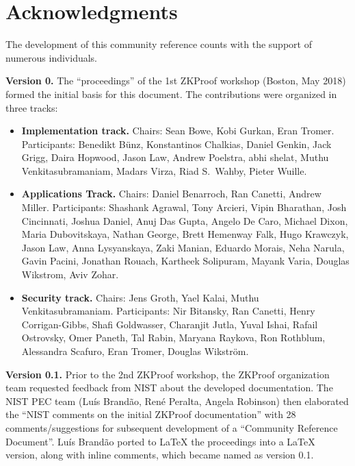 \chapter*{Acknowledgments}
\label{app:acknowledgments}



The development of this community reference counts with the support of numerous individuals.


\textbf{Version 0.}
The ``proceedings'' of the 1st ZKProof workshop (Boston, May 2018) formed the initial basis for this document.
The contributions were organized in three tracks:

\begin{itemize}\setlength{\itemsep}{1ex}
	
\item \textbf{Implementation track.} 
	Chairs: Sean Bowe, Kobi Gurkan, Eran Tromer.
	Participants: Benedikt Bünz, Konstantinos Chalkias, Daniel Genkin, Jack Grigg, Daira Hopwood, Jason Law, Andrew Poelstra, abhi shelat, Muthu Venkita\-subramaniam, Madars Virza, Riad S.\ Wahby, Pieter Wuille.
	
\item \textbf{Applications Track.}
	Chairs: Daniel Benarroch, Ran Canetti, Andrew Miller.
	Participants: Shashank Agrawal, Tony Arcieri, Vipin Bharathan, Josh Cincinnati, Joshua Daniel,  Anuj Das Gupta, Angelo De Caro, Michael Dixon, Maria Dubovitskaya, Nathan George, Brett Hemenway Falk, Hugo Krawczyk, Jason Law, Anna Lysyanskaya, Zaki Manian, Eduardo Morais, Neha Narula, Gavin Pacini, Jonathan Rouach, Kartheek Solipuram, Mayank Varia, Douglas Wikstrom, Aviv Zohar.

\item \textbf{Security track.}
	Chairs: Jens Groth, Yael Kalai, Muthu Venkitasubramaniam.
	Participants: Nir Bitansky, Ran Canetti, Henry Corrigan-Gibbs, Shafi Goldwasser, Charanjit Jutla, Yuval Ishai, Rafail Ostrovsky, Omer Paneth, Tal Rabin, Maryana Raykova, Ron Rothblum, Alessandra Scafuro, Eran Tromer, Douglas Wikström.

\end{itemize}


\textbf{Version 0.1.}
	Prior to the 2nd ZKProof workshop, the ZKProof organization team requested feedback from NIST about the developed documentation.
	The NIST PEC team (Luís Brandão, René Peralta, Angela Robinson) then elaborated the 
``NIST comments on the initial ZKProof documentation'' with 28 comments/suggestions 
for subsequent development of a ``Community Reference Document''.
	Luís Brandão ported to LaTeX the proceedings into a LaTeX version, along with inline comments, which became named as version 0.1.


